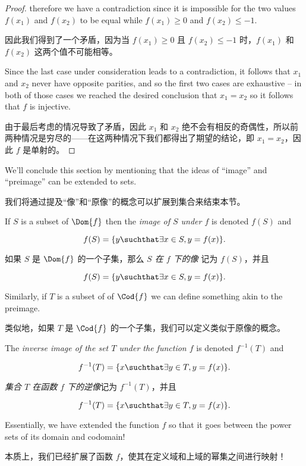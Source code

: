 \begin{proof}
\noindent therefore we have a contradiction since it is impossible
for the two values $f(x_1)$ and $f(x_2)$ to be equal while $f(x_1) \geq 0$
and $f(x_2) \leq -1$.

因此我们得到了一个矛盾，因为当 $f(x_1) \geq 0$ 且 $f(x_2) \leq -1$ 时，$f(x_1)$ 和 $f(x_2)$ 这两个值不可能相等。

Since the last case under consideration leads to a contradiction, it follows
that $x_1$ and $x_2$ never have opposite parities, and so the first two
cases are exhaustive -- in both of those cases we reached the desired
conclusion that $x_1 = x_2$ so it follows that $f$ is injective.

由于最后考虑的情况导致了矛盾，因此 $x_1$ 和 $x_2$ 绝不会有相反的奇偶性，所以前两种情况是穷尽的——在这两种情况下我们都得出了期望的结论，即 $x_1 = x_2$，因此 $f$ 是单射的。
\end{proof}

We'll conclude this section by mentioning that the ideas of ``image''
and ``preimage'' can be extended to sets.

我们将通过提及“像”和“原像”的概念可以扩展到集合来结束本节。

If $S$ is a subset of 
$\Dom{f}$ then the \emph{image of $S$ under $f$}
is denoted $f(S)$ and

\[ f(S) = \{ y \suchthat \exists x \in S, y = f(x) \}. \]

如果 $S$ 是 $\Dom{f}$ 的一个子集，那么 \emph{$S$ 在 $f$ 下的像} 记为 $f(S)$，并且

\[ f(S) = \{ y \suchthat \exists x \in S, y = f(x) \}. \]

Similarly, if $T$ is a subset of of $\Cod{f}$ we can define something akin
to the preimage.

类似地，如果 $T$ 是 $\Cod{f}$ 的一个子集，我们可以定义类似于原像的概念。

The \emph{inverse image
of the set $T$ under the function $f$} is denoted $f^{-1}(T)$ and 

\[ f^{-1}(T) = \{ x \suchthat \exists y \in T, y=f(x) \}.\]

\emph{集合 $T$ 在函数 $f$ 下的逆像}记为 $f^{-1}(T)$，并且

\[ f^{-1}(T) = \{ x \suchthat \exists y \in T, y=f(x) \}.\]

Essentially, we have extended the function $f$ so that it goes between the
power sets of its domain and codomain!

本质上，我们已经扩展了函数 $f$，使其在定义域和上域的幂集之间进行映射！

